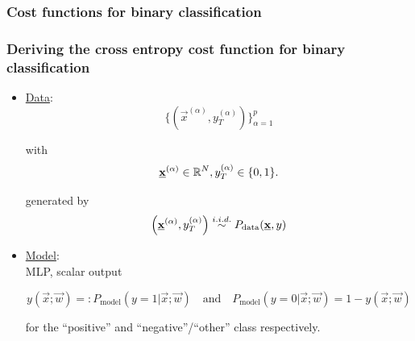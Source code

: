 
\subsubsection{Cost functions for binary classification}

\begin{frame}\frametitle{Deriving the cross entropy cost function for binary classification}


\begin{itemize}
\item[]\underline{Data}:\\

\begin{equation}
\Big\{ \left( \vec x^{(\alpha)}, y_T^{(\alpha)} \right) \Big \}_{\alpha=1}^{p}
\end{equation}

with 
$$
\underline{\mathbf{x}}^{(\alpha)} \in \mathbb{R}^N, y_T^{(\alpha)} \in \{0, 1\}.
$$

generated by
\begin{equation}
\left( \underline{\mathbf{x}}^{(\alpha)}, y_T^{(\alpha)} \right) \stackrel{i.i.d.}{\sim} P_{\text{data}}(\underline{\mathbf{x}}, y)
\end{equation}

\pause

\item[]\underline{Model}:\\

MLP, scalar output 

\begin{equation}
y(\vec x;\vec w) =: P_{\text{model}} (y=1|\vec x;\vec w) \quad \text{and} \quad P_{\text{model}} (y=0|\vec x; \vec w) = 1-y(\vec x;\vec w)
\end{equation}

for the ``positive'' and ``negative''/``other'' class respectively.

\end{itemize}

\end{frame}


